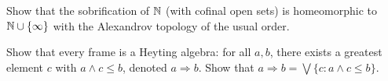\begin{exercise}
Show that the sobrification of $\mathbb{N}$ (with cofinal open sets) is homeomorphic to
$\mathbb{N} \cup \{\infty\}$ with the Alexandrov topology of the usual order.
\end{exercise}

\begin{exercise}
Show that every frame is a Heyting algebra: for all $a, b$, there exists a greatest
element $c$ with $a \wedge c \leq b$, denoted $a \Rightarrow b$. Show that
$a \Rightarrow b = \bigvee\{c : a \wedge c \leq b\}$.
\end{exercise}
